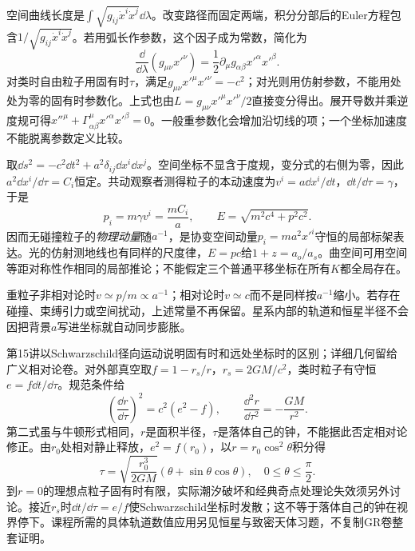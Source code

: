 空间曲线长度是$\int\sqrt{g_{ij}\dot x^i\dot x^j}\dd\lambda$。改变路径而固定两端，积分分部后的Euler方程包含$1/\sqrt{g_{ij}\dot x^i\dot x^j}$。若用弧长作参数，这个因子成为常数，简化为
\[
 \frac{\dd}{\dd\lambda}(g_{\mu\nu}x'^\nu)
 =\frac12\partial_\mu g_{\alpha\beta}x'^\alpha x'^\beta.
\]
对类时自由粒子用固有时$\tau$，满足$g_{\mu\nu}x'^\mu x'^\nu=-c^2$；对光则用仿射参数，不能用处处为零的固有时参数化。上式也由$L=g_{\mu\nu}x'^\mu x'^\nu/2$直接变分得出。展开导数并乘逆度规可得$x''^\mu+\Gamma^\mu_{\alpha\beta}x'^\alpha x'^\beta=0$。一般重参数化会增加沿切线的项；一个坐标加速度不能脱离参数定义比较。

取$\dd s^2=-c^2\dd t^2+a^2\delta_{ij}\dd x^i\dd x^j$。空间坐标不显含于度规，变分式的右侧为零，因此$a^2\dd x^i/\dd\tau=C_i$恒定。共动观察者测得粒子的本动速度为$v^i=a\dd x^i/\dd t$，$\dd t/\dd\tau=\gamma$，于是
\[
 p_{\hat i}=m\gamma v^i=\frac{mC_i}{a},\qquad
 E=\sqrt{m^2c^4+p^2c^2}.
\]
因而无碰撞粒子的\emph{物理动量}随$a^{-1}$，是协变空间动量$p_i=ma^2x'^i$守恒的局部标架表达。光的仿射测地线也有同样的尺度律，$E=pc$给$1+z=a_o/a_s$。曲空间可用空间等距对称性作相同的局部推论；不能假定三个普通平移坐标在所有$K$都全局存在。

重粒子非相对论时$v\simeq p/m\propto a^{-1}$；相对论时$v\simeq c$而不是同样按$a^{-1}$缩小。若存在碰撞、束缚引力或空间扰动，上述常量不再保留。星系内部的轨道和恒星半径不会因把背景$a$写进坐标就自动同步膨胀。

第15讲以Schwarzschild径向运动说明固有时和远处坐标时的区别；详细几何留给广义相对论卷。对外部真空取$f=1-r_s/r$，$r_s=2GM/c^2$，类时粒子有守恒$e=f\dd t/\dd\tau$。规范条件给
\[
 \left(\frac{\dd r}{\dd\tau}\right)^2=c^2(e^2-f),\qquad
 \frac{\dd^2r}{\dd\tau^2}=-\frac{GM}{r^2}.
\]
第二式虽与牛顿形式相同，$r$是面积半径，$\tau$是落体自己的钟，不能据此否定相对论修正。由$r_0$处相对静止释放，$e^2=f(r_0)$，以$r=r_0\cos^2\theta$积分得
\[
 \tau=\sqrt{\frac{r_0^3}{2GM}}(\theta+\sin\theta\cos\theta),\quad
 0\leq\theta\leq\frac\pi2.
\]
到$r=0$的理想点粒子固有时有限，实际潮汐破坏和经典奇点处理论失效须另外讨论。接近$r_s$时$\dd t/\dd\tau=e/f$使Schwarzschild坐标时发散；这不等于落体自己的钟在视界停下。课程所需的具体轨道数值应用另见恒星与致密天体习题，不复制GR卷整套证明。
